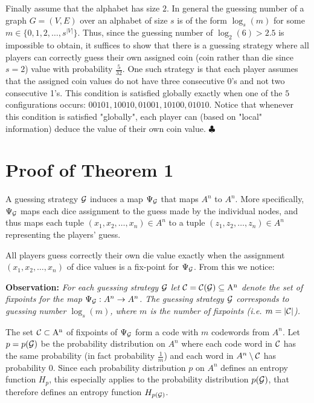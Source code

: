 \documentclass[12pt]{article}
\begin{document}
Finally assume that the alphabet has size $2$. In general the guessing number of a graph $G=(V,E)$ over an alphabet of size $s$ is of the form $\log_{s}(m)$ for some $m\in \{0,1,2, \ldots, s^{|V|}\}$. Thus,  since the guessing number of $\log_2(6) >2.5$ is impossible to obtain, it suffices to show that there is a guessing strategy where all players can correctly guess their own assigned coin (coin rather than die since $s=2$) value with probability $\frac{5}{32}$. One such strategy is that each player assumes that the assigned coin values do not have three consecutive 0's and not two consecutive 1's. This condition  is satisfied globally exactly when one of the $5$ configurations occurs: 
$00101, 10010, 01001,10100, 01010$. Notice that whenever this condition is satisfied "globally", each player can (based on "local" information) deduce the value of their own coin value.
 \hfill $\clubsuit$
 
 \section{Proof of Theorem 1}
A guessing strategy $\cal{G}$  induces a map $\Psi_{\cal{G}}$ that maps $A^n$ to $A^n$. 
More specifically, $\Psi_{\cal{G}}$ maps each dice assignment
to the guess made by the individual nodes, and thus maps each tuple
$(x_1,x_2,\ldots,x_n) \in A^n$
to a tuple \newline $(z_1,z_2,\ldots,z_n) \in A^n$ representing the players' guess.

All players guess correctly their own die value exactly when the assignment $(x_1,x_2,\ldots,x_n)$
of dice values is a fix-point for $\Psi_{\cal{G}}$. From this we notice:

\noindent
{\bf Observation:} 
{\it For each guessing strategy $\cal{G}$ let $\cal{C}=\cal{C}(\cal{G}) \subseteq {\rm A}^{\rm n}$ denote the set of fixpoints for the map $\Psi_{\cal{G}} :A^n \rightarrow A^n$. The guessing strategy $\cal{G}$ corresponds to guessing number $\log_s(m)$, where $m$ is the number of fixpoints 
(i.e. $m=|\cal{C} |$).}

The set  $\cal{C} \subset {\rm A}^{\rm n}$ of fixpoints of $\Psi_{\cal{G}}$ form a code with $m$ codewords from $A^n$.  Let $p=p(\cal{G})$ be the probability distribution on $A^n$ where 
each code word in $\cal{C}$ has the same probability (in fact probability $\frac{1}{m}$) and each word in $A^n \setminus \cal{C}$ has probability $0$. Since each probability distribution $p$ on $A^n$ defines an entropy function $H_p$, this especially applies to the probability distribution $p(\cal{G})$, that therefore defines an entropy function $H_{p(\cal{G})}$.
\end{document}

